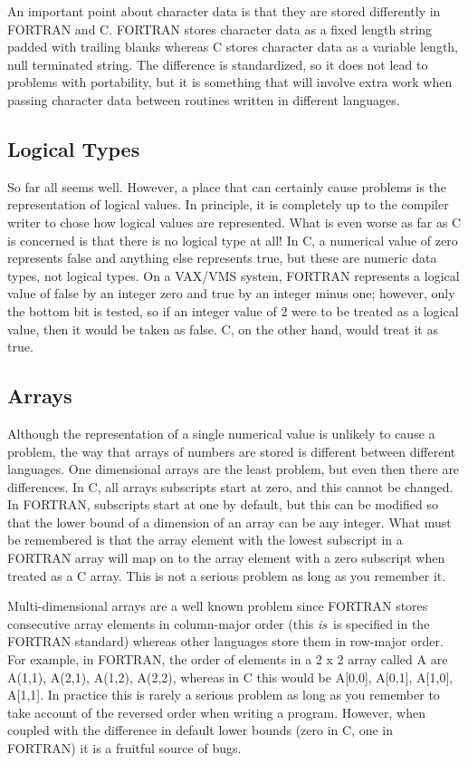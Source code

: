 An important point about character data is that they are stored differently in
FORTRAN and C. FORTRAN stores character data as a fixed length string padded
with trailing blanks whereas C stores character data as a variable length, null
terminated string. The difference is standardized, so it does not lead to
problems with portability, but it is something that will involve extra work
when passing character data between routines written in different languages.

\subsection{Logical Types}

So far all seems well. However, a place that can certainly cause problems is
the representation of logical values. In principle, it is completely up to the
compiler writer to chose how logical values are represented. What is even worse
as far as C is concerned is that there is no logical type at all! In C, a
numerical value of zero represents false and anything else represents true, but
these are numeric data types, not logical types. On a VAX/VMS system, FORTRAN
represents a logical value of false by an integer zero and true by an integer
minus one; however, only the bottom bit is tested, so if an integer value of 2
were to be treated as a logical value, then it would be taken as false. C, on
the other hand, would treat it as true.

\subsection{Arrays}

Although the representation of a single numerical value is unlikely to cause a
problem, the way that arrays of numbers are stored is different between
different languages. One dimensional arrays are the least problem, but even
then there are differences. In C, all arrays subscripts start at zero, and this
cannot be changed. In FORTRAN, subscripts start at one by default, but this can
be modified so that the lower bound of a dimension of an array can be any
integer. What must be remembered is that the array element with the lowest
subscript in a FORTRAN array will map on to the array element with a zero
subscript when treated as a C array. This is not a serious problem as long as
you remember it.

Multi-dimensional arrays are a well known problem since FORTRAN stores
consecutive array elements in column-major order (this {\em is}\, is specified
in the FORTRAN standard) whereas other languages store them in row-major order.
For example, in FORTRAN, the order of elements in a 2 x 2 array called A are
A(1,1), A(2,1), A(1,2), A(2,2), whereas in C this would be A[0,0], A[0,1],
A[1,0], A[1,1]. In practice this is rarely a serious problem as long as you
remember to take account of the reversed order when writing a program. However,
when coupled with the difference in default lower bounds (zero in C, one in
FORTRAN) it is a fruitful source of bugs.

